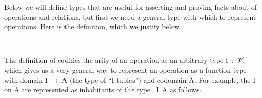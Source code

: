 Below we will define types that are useful for asserting and proving facts about  of operations and relations, but first we need a general type with which to represent operations.  Here is the definition, which we justify below.
\ccpad
\begin{code}
\>[0]\AgdaSpace{}%
\AgdaSymbol{:}\AgdaSpace{}%
\AgdaSpace{}%
\AgdaSpace{}%
\AgdaSpace{}%
\AgdaSpace{}%
\AgdaSpace{}%
\AgdaSpace{}%
\AgdaSpace{}%
\AgdaSpace{}%
\AgdaSpace{}%
\<%
\\
\>[0]\AgdaSpace{}%
\AgdaSpace{}%
\AgdaSpace{}%
\AgdaSymbol{=}\AgdaSpace{}%
\AgdaSymbol{(}\AgdaSpace{}%
\AgdaSpace{}%
\AgdaSymbol{)}\AgdaSpace{}%
\AgdaSpace{}%
\<%
\end{code}
\ccpad
The definition of  codifies the arity of an operation as an arbitrary type \ab I~\as :~\ab 𝓥\af ̇, which gives us a very general way to represent an operation as a function type with domain \ab I~\as →~\ab A (the type of ``\ab I-tuples'') and codomain \ab A. For example, the \ab I- on \ab A are represented as inhabitants of the type ~\ab I~\ab A as follows.
\ccpad
\begin{code}
\>[0]\AgdaSpace{}%
\AgdaSymbol{:}\AgdaSpace{}%
\AgdaSymbol{\{}\AgdaSpace{}%
\AgdaSymbol{:}\AgdaSpace{}%
\AgdaSpace{}%
\AgdaSpace{}%
\AgdaSymbol{\}}\AgdaSpace{}%
\AgdaSymbol{\{}\AgdaSpace{}%
\AgdaSymbol{:}\AgdaSpace{}%
\AgdaSpace{}%
\AgdaSpace{}%
\AgdaSymbol{\}}\AgdaSpace{}%
\AgdaSpace{}%
\AgdaSpace{}%
\AgdaSpace{}%
\AgdaSpace{}%
\AgdaSpace{}%
\<%
\\
\>[0]\AgdaSpace{}%
\AgdaSpace{}%
\AgdaSpace{}%
\AgdaSymbol{=}\AgdaSpace{}%
\AgdaSpace{}%
\<%
\end{code}
\scpad

